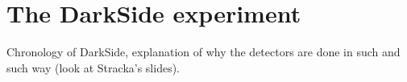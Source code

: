 \chapter{The DarkSide experiment}
\label{ch:darkside}

Chronology of DarkSide, explanation of why the detectors are done in such and
such way (look at Stracka's slides).
